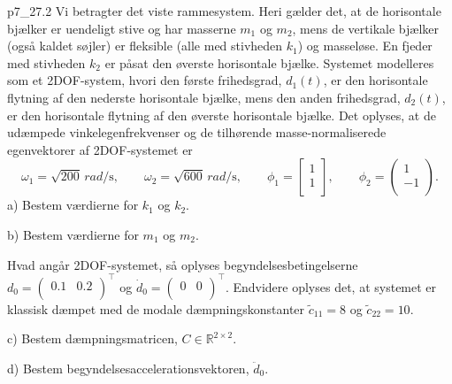 \begin{problemwithimage}{p7_2}{7.2}
  Vi betragter det viste rammesystem.
  Heri gælder det, at de horisontale bjælker er uendeligt stive og har masserne $m_1$ og $m_2$, mens de vertikale bjælker (også kaldet søjler) er fleksible (alle med stivheden $k_1$) og masseløse.
  En fjeder med stivheden $k_2$ er påsat den øverste horisontale bjælke.
  Systemet modelleres som et 2DOF-system, hvori den første frihedsgrad, $d_1(t)$, er den horisontale flytning af den nederste horisontale bjælke, mens den anden frihedsgrad, $d_2(t)$, er den horisontale flytning af den øverste horisontale bjælke.
  Det oplyses, at de udæmpede vinkelegenfrekvenser og de tilhørende masse-normaliserede egenvektorer af 2DOF-systemet er
  \[ 
  \omega_1 = \sqrt{200} \, \unit{rad\per\s}, \qquad \omega_2 = \sqrt{600} \, \unit{rad\per\s}, \qquad \phi_1 = \begin{bmatrix}
  1 \\
  1 \\
  \end{bmatrix}, \qquad \phi_2 = \begin{pmatrix}
  1\\
  -1\\
  \end{pmatrix}
  .\]
  a) Bestem værdierne for $k_1$ og $k_2$.

  b) Bestem værdierne for $m_1$ og $m_2$.
  
  Hvad angår 2DOF-systemet, så oplyses begyndelsesbetingelserne $d_0 = \begin{pmatrix}
  \num{0,1}  & \num{0,2} \\
  \end{pmatrix}^{\intercal}$ og $\dot{d}_0 = \begin{pmatrix}
  0 & 0\\
  \end{pmatrix}^{\intercal}$.
  Endvidere oplyses det, at systemet er klassisk dæmpet med de modale dæmpningskonstanter $\tilde{c}_{11} = 8$ og $\tilde{c}_{22} = 10$.

  c) Bestem dæmpningsmatricen, $C \in \mathbb{R}^{2 \times 2}$.

  d) Bestem begyndelsesaccelerationsvektoren, $\ddot{d}_0$.
\end{problemwithimage}

